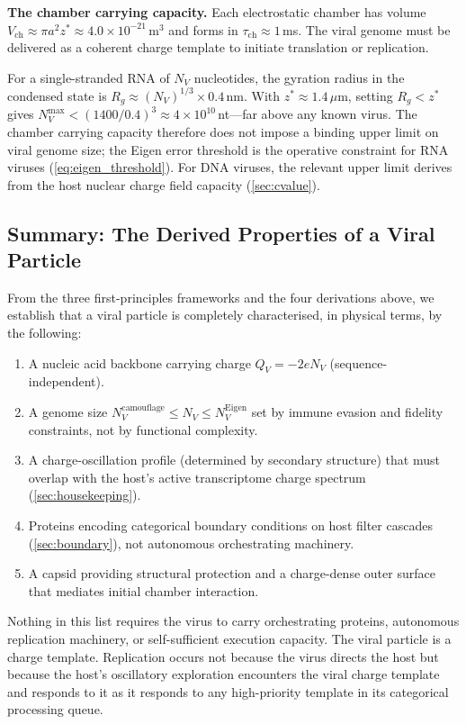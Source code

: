 \documentclass[12pt,a4paper]{article}
\theoremstyle{definition}
\theoremstyle{remark}
\newcommand{\taucham}{\tau_{\mathrm{ch}}}
\newcommand{\zstar}{z^{*}}
\begin{document}
\textbf{The chamber carrying capacity.}
Each electrostatic chamber has volume $V_{\mathrm{ch}} \approx \pi a^2 \zstar \approx 4.0 \times 10^{-21}$\,m$^3$ and forms in $\taucham \approx 1$\,ms. The viral genome must be delivered as a coherent charge template to initiate translation or replication.

For a single-stranded RNA of $N_V$ nucleotides, the gyration radius in the condensed state is $R_g \approx (N_V)^{1/3} \times 0.4$\,nm. With $\zstar \approx 1.4\,\mu$m, setting $R_g < \zstar$ gives $N_V^{\max} < (1400/0.4)^3 \approx 4 \times 10^{10}$\,nt---far above any known virus. The chamber carrying capacity therefore does not impose a binding upper limit on viral genome size; the Eigen error threshold is the operative constraint for RNA viruses (\cref{eq:eigen_threshold}). For DNA viruses, the relevant upper limit derives from the host nuclear charge field capacity (\cref{sec:cvalue}).

\subsection{Summary: The Derived Properties of a Viral Particle}

From the three first-principles frameworks and the four derivations above, we establish that a viral particle is completely characterised, in physical terms, by the following:

\begin{enumerate}[(1)]
  \item A nucleic acid backbone carrying charge $Q_V = -2e N_V$ (sequence-independent).
  \item A genome size $N_V^{\mathrm{camouflage}} \leq N_V \leq N_V^{\mathrm{Eigen}}$ set by immune evasion and fidelity constraints, not by functional complexity.
  \item A charge-oscillation profile (determined by secondary structure) that must overlap with the host's active transcriptome charge spectrum (\cref{sec:housekeeping}).
  \item Proteins encoding categorical boundary conditions on host filter cascades (\cref{sec:boundary}), not autonomous orchestrating machinery.
  \item A capsid providing structural protection and a charge-dense outer surface that mediates initial chamber interaction.
\end{enumerate}

Nothing in this list requires the virus to carry orchestrating proteins, autonomous replication machinery, or self-sufficient execution capacity. The viral particle is a charge template. Replication occurs not because the virus directs the host but because the host's oscillatory exploration encounters the viral charge template and responds to it as it responds to any high-priority template in its categorical processing queue.
\end{document}
